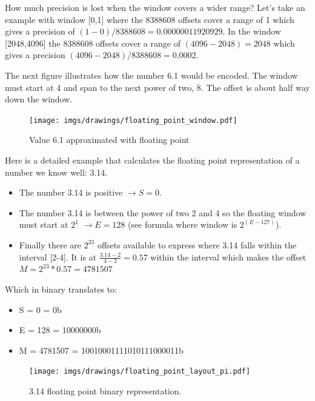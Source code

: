 \documentclass[book.tex]{subfiles}
\begin{document}
\par {} How much precision is lost when the window covers a wider range? Let's take an example with window [0,1] where the 8388608 offsets cover a range of 1 which gives a precision of $(1-0)/8388608=0.00000011920929$. In the window [2048,4096] the 8388608 offsets cover a range of $(4096-2048) = 2048$ which gives a precision $ (4096-2048)/8388608=0.0002$.\\
\par

The next figure illustrates how the number 6.1 would be encoded. The window must start at 4 and span to the next power of two, 8. The offset is about half way down the window.

\begin{figure}[H]
\centering
\texttt{[image: imgs/drawings/floating\_point\_window.pdf]}

\caption{Value 6.1 approximated with floating point}
\label{fig:fp_internals_window6_1}
\end{figure}
  \bigskip
  
Here is a detailed example that calculates the floating point representation of a number we know well: 3.14.
\begin{itemize}
 \item The number 3.14 is positive  $\rightarrow S=0$.
 \item The number 3.14 is between the power of two 2 and 4 so the floating window must start at $2^1$  $\rightarrow E=128$ (see formula where window is $2^{(E-127)}$).
 \item Finally there are $2^{23}$ offsets available to express where 3.14 falls within the interval [2-4]. It is at $\frac{3.14 -2 }{4 - 2} = 0.57$ within the interval which makes the offset $ M = 2^{23}*0.57 = 4781507$
\end{itemize}

Which in binary translates to:

\begin{itemize}
\item S = 0 = 0b
\item E = 128 = 10000000b
\item M = 4781507 = 10010001111010111000011b
\end{itemize}

\begin{figure}[H]
\centering
\texttt{[image: imgs/drawings/floating\_point\_layout\_pi.pdf]}
\caption{3.14 floating point binary representation.}
\label{fig:fp_internals}
\end{figure}
  \bigskip
\end{document}
